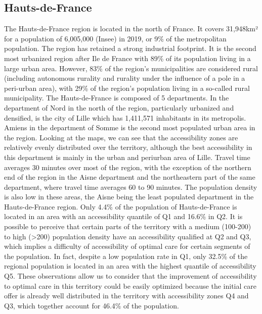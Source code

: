 \subsection*{Hauts-de-France}

The Hauts-de-France region is located in the north of France. It covers
31,948km² for a population of 6,005,000 (Insee) in 2019, or 9\% of the
metropolitan population. The region has retained a strong industrial footprint.
It is the second most urbanized region after Ile de France with 89\% of its
population living in a large urban area. However, 83\% of the region's
municipalities are considered rural (including autonomous rurality and rurality
under the influence of a pole in a peri-urban area), with 29\% of the region's
population living in a so-called rural municipality. The Hauts-de-France is
composed of 5 departments. In the department of Nord in the north of the region,
particularly urbanized and densified, is the city of Lille which has 1,411,571
inhabitants in its metropolis. Amiens in the department of Somme is the second
most populated urban area in the region. Looking at the maps, we can see that
the accessibility zones are relatively evenly distributed over the territory,
although the best accessibility in this department is mainly in the urban and
periurban area of Lille. Travel time averages 30 minutes over most
of the region, with the exception of the northern end of the region in the Aisne
department and the northeastern part of the same department, where travel time
averages 60 to 90 minutes. The population density is also low in these areas,
the Aisne being the least populated department in the Hauts-de-France region.
Only 4.4\% of the population of Hauts-de-France is located in an area with an
accessibility quantile of Q1 and 16.6\% in Q2. It is possible to perceive that
certain parts of the territory with a medium (100-200) to high (>200) population
density have an accessibility qualified at Q2 and Q3, which
implies a difficulty of accessibility of optimal care for certain segments of
the population. In fact, despite a low population rate in Q1, only 32.5\% of the
regional population is located in an area with the highest quantile of
accessibility Q5. These observations allow us to consider that the improvement
of accessibility to optimal care in this territory could be easily optimized
because the initial care offer is already well distributed in the territory with
accessibility zones Q4 and Q3, which together account for 46.4\% of the
population.

